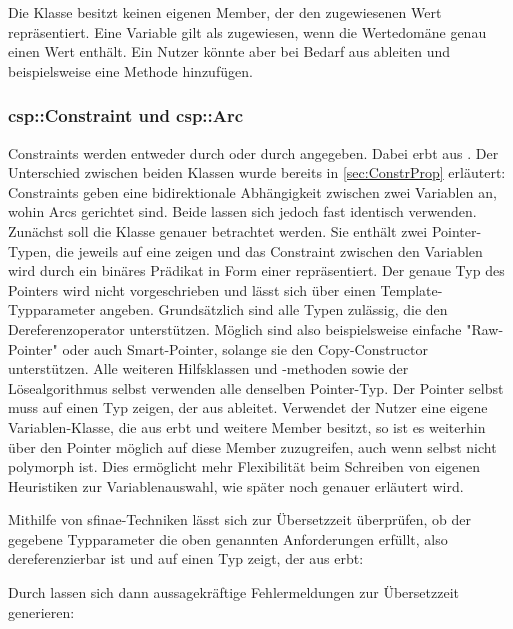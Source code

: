 Die Klasse  besitzt keinen eigenen Member, der den zugewiesenen Wert repräsentiert. Eine Variable gilt als zugewiesen, wenn die Wertedomäne genau einen
Wert enthält. Ein Nutzer könnte aber bei Bedarf aus  ableiten und beispielsweise eine Methode  hinzufügen.

\subsubsection{csp::Constraint und csp::Arc}
\label{sec:ArcConstr}
Constraints werden entweder durch  oder durch  angegeben. Dabei erbt  aus . Der Unterschied
zwischen beiden Klassen wurde bereits in \cref{sec:ConstrProp} erläutert: Constraints geben eine bidirektionale Abhängigkeit zwischen zwei Variablen an, wohin Arcs gerichtet sind.
Beide lassen sich jedoch fast identisch verwenden. Zunächst soll die Klasse  genauer betrachtet werden. Sie enthält zwei Pointer-Typen, die jeweils auf
eine  zeigen und das Constraint zwischen den Variablen wird durch ein binäres Prädikat in Form einer  repräsentiert. Der genaue Typ
des Pointers wird nicht vorgeschrieben und lässt sich über einen Template-Typparameter angeben. Grundsätzlich sind alle Typen zulässig, die den Dereferenzoperator \inlcode{*}
unterstützen. Möglich sind also beispielsweise einfache "Raw-Pointer" oder auch Smart-Pointer, solange sie den Copy-Constructor unterstützen. Alle weiteren Hilfsklassen und
-methoden sowie der Lösealgorithmus selbst verwenden alle denselben Pointer-Typ. Der Pointer selbst muss auf einen Typ zeigen, der aus  ableitet. Verwendet
der Nutzer eine eigene Variablen-Klasse, die aus  erbt und weitere Member besitzt, so ist es weiterhin über den Pointer möglich auf diese Member zuzugreifen,
auch wenn  selbst nicht polymorph ist. Dies ermöglicht mehr Flexibilität beim Schreiben von eigenen Heuristiken zur Variablenauswahl, wie später noch genauer
erläutert wird.

Mithilfe von \ac*{sfinae}-Techniken lässt sich zur Übersetzzeit überprüfen, ob der gegebene Typparameter die oben genannten Anforderungen erfüllt, also
dereferenzierbar ist und auf einen Typ zeigt, der aus  erbt:

Durch  lassen sich dann aussagekräftige Fehlermeldungen zur Übersetzzeit generieren:


